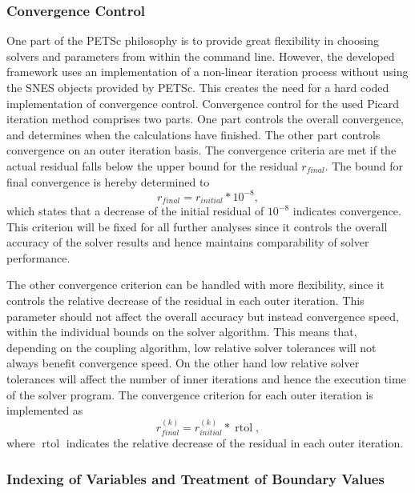 \subsubsection{Convergence Control} 
\label{sec:convergence}
One part of the PETSc philosophy is to provide great flexibility in choosing solvers and parameters from within the command line. However, the developed framework uses an implementation of a non-linear iteration process without using the SNES objects provided by PETSc. This creates the need for a hard coded implementation of convergence control. Convergence control for the used Picard iteration method comprises two parts. One part controls the overall convergence, and determines when the calculations have finished. The other part controls convergence on an outer iteration basis. The convergence criteria are met if the actual residual falls below the upper bound for the residual \(r_{final}\). The bound for final convergence is hereby determined to
\begin{displaymath}
  r_{final} = r_{initial} * 10^{-8},
\end{displaymath}
which states that a decrease of the initial residual of \(10^{-8}\) indicates convergence. This criterion will be fixed for all further analyses since it controls the overall accuracy of the solver results and hence maintains comparability of solver performance. 

The other convergence criterion can be handled with more flexibility, since it controls the relative decrease of the residual in each outer iteration. This parameter should not affect the overall accuracy but instead convergence speed, within the individual bounds on the solver algorithm. This means that, depending on the coupling algorithm, low relative solver tolerances will not always benefit convergence speed. On the other hand low relative solver tolerances will affect the number of inner iterations and hence the execution time of the solver program. The convergence criterion for each outer iteration is implemented as
\begin{displaymath}
  r_{final}^{(k)} = r_{initial}^{(k)} * \operatorname{rtol},
\end{displaymath}
where \(\operatorname{rtol}\) indicates the relative decrease of the residual in each outer iteration. 

\subsubsection{Indexing of Variables and Treatment of Boundary Values}

